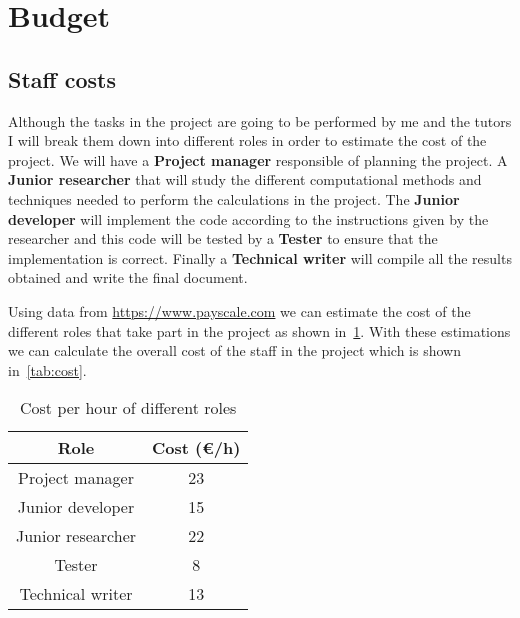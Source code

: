 
\section{Budget}%
\label{sec:budget}

\subsection{Staff costs}%
\label{sub:staff}

Although the tasks in the project are going to be performed by me and the tutors
I will break them down into different roles in order to estimate the cost of the
project. We will have a \textbf{Project manager} responsible of planning the
project. A \textbf{Junior researcher} that will study the different
computational methods and techniques needed to perform the calculations in the
project. The \textbf{Junior developer} will implement the code according to the
instructions given by the researcher and this code will be tested by a
\textbf{Tester} to ensure that the implementation is correct. Finally a
\textbf{Technical writer} will compile all the results obtained and write the
final document.

Using data from \url{https://www.payscale.com} we can estimate the cost of the
different roles that take part in the project as shown in~\cref{tab:pay}. With
these estimations we can calculate the overall cost of the staff in the project
which is shown in~\cref{tab:cost}.

\begin{table}[H]
    \centering
    \caption{Cost per hour of different roles}\label{tab:pay}
    \begin{tabular}{cc}
        \toprule
        Role & Cost (€/h) \\
        \midrule
        Project manager & 23 \\
        Junior developer & 15 \\
        Junior researcher & 22 \\
        Tester & 8 \\
        Technical writer & 13 \\
        \bottomrule
    \end{tabular}
\end{table}

